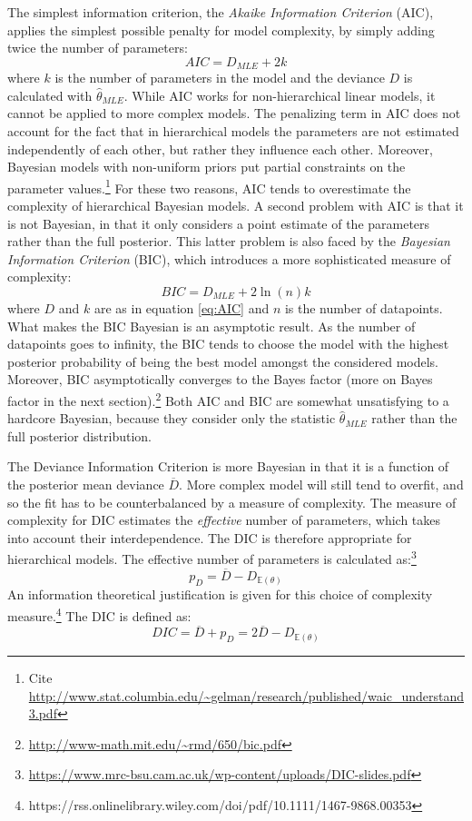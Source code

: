 \documentclass[a4paper,12pt,twoside]{article}
\begin{document}
The simplest information criterion, the \textit{Akaike Information Criterion} (AIC), applies the simplest possible penalty for model complexity, by simply adding twice the number of parameters:
%
\begin{equation}\label{eq:AIC}
AIC = D_{MLE} + 2k
\end{equation}
%
where $k$ is the number of parameters in the model and the deviance $D$ is calculated with $\hat{\theta}_{MLE}$. While AIC works for non-hierarchical linear models, it cannot be applied to more complex models. The penalizing term in AIC does not account for the fact that in hierarchical models the parameters are not estimated independently of each other, but rather they influence each other. Moreover, Bayesian models with non-uniform priors put partial constraints on the parameter values.\footnote{Cite \url{http://www.stat.columbia.edu/~gelman/research/published/waic_understand3.pdf}} For these two reasons, AIC tends to overestimate the complexity of hierarchical Bayesian models. A second problem with AIC is that it is not Bayesian, in that it only considers a point estimate of the parameters rather than the full posterior. This latter problem is also faced by the \textit{Bayesian Information Criterion} (BIC), which introduces a more sophisticated measure of complexity:
$$
BIC = D_{MLE} + 2 \ln (n) k
$$
where $D$ and $k$ are as in equation \ref{eq:AIC} and $n$ is the number of datapoints. What makes the BIC Bayesian is an asymptotic result. As the number of datapoints goes to infinity, the BIC tends to choose the model with the highest posterior probability of being the best model amongst the considered models. Moreover, BIC asymptotically converges to the Bayes factor (more on Bayes factor in the next section).\footnote{\url{http://www-math.mit.edu/~rmd/650/bic.pdf}} Both AIC and BIC are somewhat unsatisfying to a hardcore Bayesian, because they consider only the statistic $\hat{\theta}_{MLE}$ rather than the full posterior distribution.

The Deviance Information Criterion is more Bayesian in that it is a function of the posterior mean deviance $\overline{D}$. More complex model will still tend to overfit, and so the fit has to be counterbalanced by a measure of complexity. The measure of complexity for DIC estimates the \textit{effective} number of parameters, which takes into account their interdependence. The DIC is therefore appropriate for hierarchical models. The effective number of parameters is calculated as:\footnote{\url{https://www.mrc-bsu.cam.ac.uk/wp-content/uploads/DIC-slides.pdf}}
%
$$
p_D = \overline{D} - D_{\mathbb{E}(\theta)}
$$
%
An information theoretical justification is given for this choice of complexity measure.\footnote{https://rss.onlinelibrary.wiley.com/doi/pdf/10.1111/1467-9868.00353} The DIC is defined as:
%
$$
DIC = \overline{D} + p_D = 2 \overline{D} - D_{\mathbb{E}(\theta)}
$$
%
\end{document}
